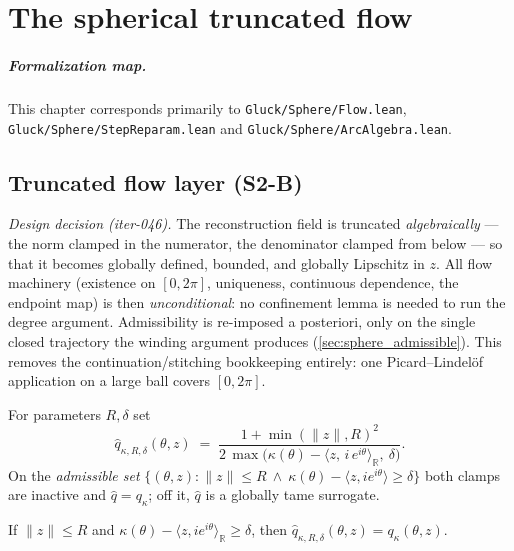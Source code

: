 \chapter{The spherical truncated flow}
\label{chap:sphere_flow}


\paragraph{Formalization map.}
This chapter corresponds primarily to \texttt{Gluck/Sphere/Flow.lean}, \texttt{Gluck/Sphere/StepReparam.lean} and \texttt{Gluck/Sphere/ArcAlgebra.lean}.

\section{Truncated flow layer (S2-B)}
\label{sec:sphere_flow}

\emph{Design decision (iter-046).} The reconstruction field is truncated
\emph{algebraically} — the norm clamped in the numerator, the denominator clamped from
below — so that it becomes globally defined, bounded, and globally Lipschitz in $z$. All
flow machinery (existence on $[0,2\pi]$, uniqueness, continuous dependence, the endpoint
map) is then \emph{unconditional}: no confinement lemma is needed to run the degree
argument. Admissibility is re-imposed a posteriori, only on the single closed trajectory
the winding argument produces (\cref{sec:sphere_admissible}). This removes the
continuation/stitching bookkeeping entirely: one Picard--Lindel\"of application on a
large ball covers $[0,2\pi]$.

\begin{definition}

  \label{def:truncated_speed}
  For parameters $R,\delta$ set
  \[
    \hat q_{\kappa,R,\delta}(\theta,z)\;=\;
      \frac{1+\min(\|z\|,R)^2}
        {2\,\max\bigl(\kappa(\theta)-\langle z,\,i\,e^{i\theta}\rangle_{\mathbb R},\ \delta\bigr)}.
  \]
  On the \emph{admissible set}
  $\{(\theta,z):\|z\|\le R\ \wedge\ \kappa(\theta)-\langle z,i e^{i\theta}\rangle\ge\delta\}$
  both clamps are inactive and $\hat q=q_\kappa$; off it, $\hat q$ is a globally tame
  surrogate.
\end{definition}

\begin{lemma}

  \label{lem:truncated_speed_eq}
  If $\|z\|\le R$ and $\kappa(\theta)-\langle z,i e^{i\theta}\rangle_{\mathbb R}\ge\delta$,
  then $\hat q_{\kappa,R,\delta}(\theta,z)=q_\kappa(\theta,z)$.
\end{lemma}

